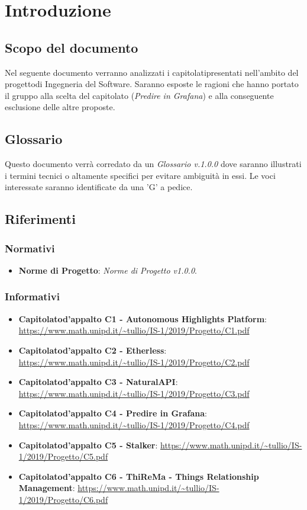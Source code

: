 \section{Introduzione}
\subsection{Scopo del documento}
    Nel seguente documento verranno analizzati i capitolati\glosp presentati nell'ambito del progetto\glosp di Ingegneria del Software. Saranno esposte le ragioni che hanno portato il gruppo alla scelta del capitolato (\textit{Predire in Grafana}) e alla conseguente esclusione delle altre proposte.
\subsection{Glossario}
    Questo documento verrà corredato da un \textit{Glossario v.1.0.0} dove saranno illustrati i termini tecnici o altamente specifici per evitare ambiguità in essi. Le voci interessate saranno identificate da una 'G' a pedice.
\subsection{Riferimenti}
\subsubsection{Normativi}
\begin{itemize}
	\item \textbf{Norme di Progetto}: \textit{Norme di Progetto v1.0.0}.
\end{itemize}
\subsubsection{Informativi}
\begin{itemize}
    \item \textbf{Capitolato}\glosp \textbf{d'appalto C1 - Autonomous Highlights Platform}:  \url{https://www.math.unipd.it/~tullio/IS-1/2019/Progetto/C1.pdf}
    \item \textbf{Capitolato}\glosp \textbf{d'appalto C2 - Etherless}:  \url{https://www.math.unipd.it/~tullio/IS-1/2019/Progetto/C2.pdf}
    \item \textbf{Capitolato}\glosp \textbf{d'appalto C3 - NaturalAPI}:  \url{https://www.math.unipd.it/~tullio/IS-1/2019/Progetto/C3.pdf}
    \item \textbf{Capitolato}\glosp \textbf{d'appalto C4 - Predire in Grafana}:  \url{https://www.math.unipd.it/~tullio/IS-1/2019/Progetto/C4.pdf}
    \item \textbf{Capitolato}\glosp \textbf{d'appalto C5 - Stalker}:  \url{https://www.math.unipd.it/~tullio/IS-1/2019/Progetto/C5.pdf}
    \item \textbf{Capitolato}\glosp \textbf{d'appalto C6 - ThiReMa - Things Relationship Management}: \url{https://www.math.unipd.it/~tullio/IS-1/2019/Progetto/C6.pdf}
\end{itemize}
